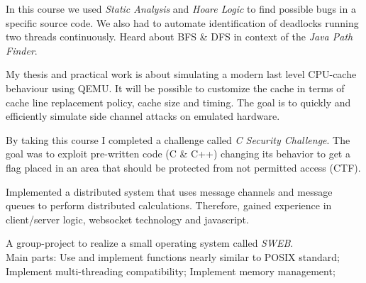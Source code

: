 \documentclass[]{resume}
\begin{document}
\begin{minipage}[t]{0.66\textwidth}
		In this course we used \textit{Static Analysis} and \textit{Hoare Logic} to find possible bugs in a specific source code. We also had to automate identification of deadlocks running two threads continuously. Heard about BFS \& DFS in context of the \textit{Java Path Finder}.  \sectionsep
	
		My thesis and practical work is about simulating a modern last level CPU-cache behaviour using QEMU. It will be possible to customize the cache in terms of cache line replacement policy, cache size and timing. The goal is to quickly and efficiently simulate side channel attacks on emulated hardware. \sectionsep
	
		By taking this course I completed a challenge called \textit{C Security Challenge}. The goal was to exploit pre-written code (C \& C++) changing its behavior to get a flag placed in an area that should be protected from not permitted access (CTF). \sectionsep
		
		Implemented a distributed system that uses message channels and message queues to perform distributed calculations. Therefore, gained experience in client/server logic, websocket technology and javascript. \sectionsep
		
		A group-project to realize a small operating system called \textit{SWEB}. \\ 
		Main parts: Use and implement functions nearly similar to POSIX standard; Implement multi-threading compatibility; Implement memory management;\sectionsep 
		
\end{minipage} 
\vfill \vfill \vfill \vfill
\end{document}
